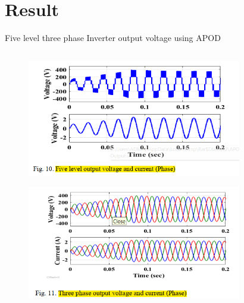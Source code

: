 \documentclass[
	11pt, %
]{beamer}
\begin{document}

\section{Result}
\begin{frame}{Five level three phase Inverter output voltage using APOD}
	\begin{columns}
	\begin{column}{0.5\textwidth}
		\begin{figure}
			\includegraphics[width=1\linewidth]{APOD_V_C.png}
		\end{figure}
		\begin{figure}
			\includegraphics[width=1\linewidth]{APOD_V_C_3.png}
		\end{figure}
	\end{column}
	\begin{column}{0.5\textwidth}
		\begin{figure}

\end{figure}
\end{column}
\end{columns}
\end{frame}
\end{document}
